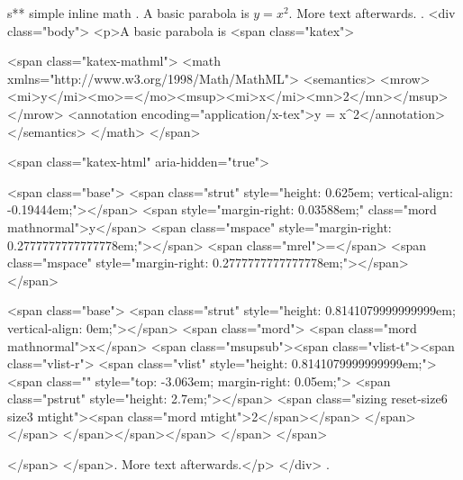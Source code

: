 s** simple inline math
.
A basic parabola is $y = x^2$. More text afterwards.
.
<div class="body">
<p>A basic parabola is <span class="katex">

<span class="katex-mathml">
<math xmlns="http://www.w3.org/1998/Math/MathML">
<semantics>
<mrow><mi>y</mi><mo>=</mo><msup><mi>x</mi><mn>2</mn></msup></mrow>
<annotation encoding="application/x-tex">y = x^2</annotation>
</semantics>
</math>
</span>

<span class="katex-html" aria-hidden="true">

<span class="base">
<span class="strut" style="height: 0.625em; vertical-align: -0.19444em;"></span>
<span style="margin-right: 0.03588em;" class="mord mathnormal">y</span>
<span class="mspace" style="margin-right: 0.2777777777777778em;"></span>
<span class="mrel">=</span>
<span class="mspace" style="margin-right: 0.2777777777777778em;"></span>
</span>

<span class="base">
<span class="strut" style="height: 0.8141079999999999em; vertical-align: 0em;"></span>
<span class="mord">
<span class="mord mathnormal">x</span>
<span class="msupsub"><span class="vlist-t"><span class="vlist-r">
<span class="vlist" style="height: 0.8141079999999999em;">
<span class="" style="top: -3.063em; margin-right: 0.05em;">
<span class="pstrut" style="height: 2.7em;"></span>
<span class="sizing reset-size6 size3 mtight"><span class="mord mtight">2</span></span>
</span>
</span>
</span></span></span>
</span>
</span>

</span>
</span>. More text afterwards.</p>
</div>
.
